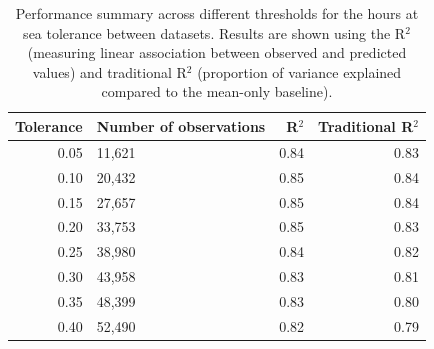\begin{table}[!h]
\centering
\caption{\label{tab:tab-performance-tolerance-table}Performance summary across different thresholds for the hours at sea tolerance between datasets. Results are shown using the R$^{2}$ (measuring linear association between observed and predicted values) and traditional R$^{2}$ (proportion of variance explained compared to the mean-only baseline).}
\centering
\fontsize{8}{10}\selectfont
\begin{tabular}[t]{r|l|r|r}
\hline
Tolerance & Number of observations & R$^{2}$ & Traditional R$^{2}$\\
\hline
0.05 & 11,621 & 0.84 & 0.83\\
\hline
0.10 & 20,432 & 0.85 & 0.84\\
\hline
0.15 & 27,657 & 0.85 & 0.84\\
\hline
0.20 & 33,753 & 0.85 & 0.83\\
\hline
0.25 & 38,980 & 0.84 & 0.82\\
\hline
0.30 & 43,958 & 0.83 & 0.81\\
\hline
0.35 & 48,399 & 0.83 & 0.80\\
\hline
0.40 & 52,490 & 0.82 & 0.79\\
\hline
\end{tabular}
\end{table}
